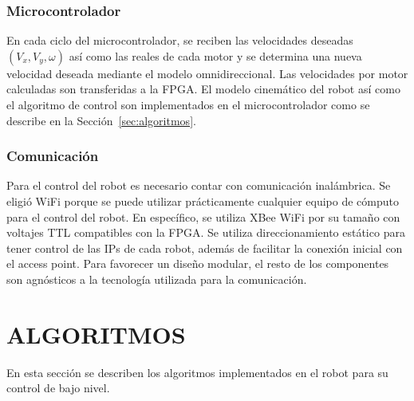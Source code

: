\documentclass[twocolumn,10pt]{amrob}
\begin{document}
\subsubsection*{Microcontrolador}
\label{sec:micro}
En cada ciclo del microcontrolador, se reciben las velocidades deseadas $(V_x,V_y,\omega)$ así como las reales de cada motor y se determina una nueva velocidad deseada mediante el modelo omnidireccional. Las velocidades por motor calculadas son transferidas a la FPGA. El modelo cinemático del robot así como el algoritmo de control son implementados en el microcontrolador como se describe en la Sección~\ref{sec:algoritmos}.

\subsubsection*{Comunicación}
\label{sec:comunicaciones}
Para el control del robot es necesario contar con comunicación inalámbrica. Se eligió WiFi porque se puede utilizar prácticamente cualquier equipo de cómputo para el control del robot. En específico, se utiliza XBee WiFi por su tamaño con voltajes TTL compatibles con la FPGA. Se utiliza direccionamiento estático para tener control de las IPs de cada robot, además de facilitar la conexión inicial con el access point. Para favorecer un diseño modular, el resto de los componentes son agnósticos a la tecnología utilizada para la comunicación. \par %


\section*{ALGORITMOS}
\label{sec:algoritmos}
En esta sección se describen los algoritmos implementados en el robot para su control de bajo nivel.
\end{document}

